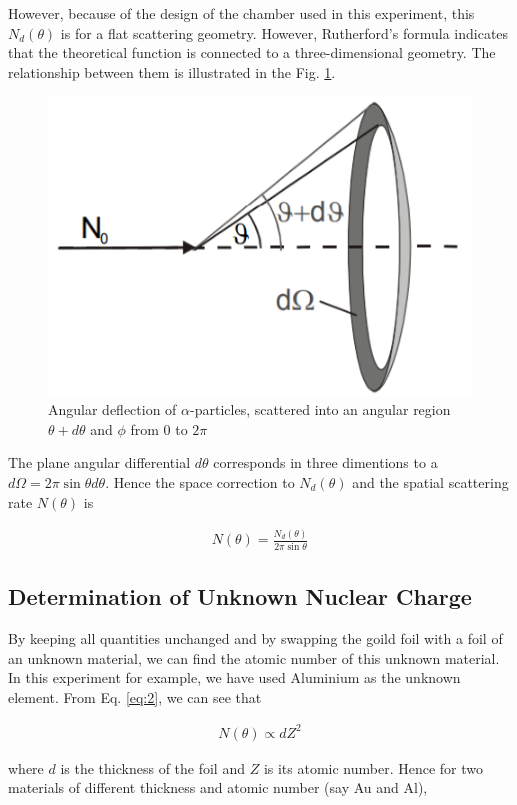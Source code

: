 However, because of the design of the chamber
used in this experiment, this $N_d(\theta)$ is for a flat scattering geometry. However, Rutherford’s formula indicates that the theoretical function is connected to a three-dimensional geometry. The relationship between them is
illustrated in the Fig. \ref{2}.

\begin{figure}
    \centering
    \includegraphics[width=0.6\columnwidth]{images/angle.png}
    \caption{Angular deflection of $\alpha$-particles, scattered into an angular region $\theta + d\theta$ and $\phi$ from 0 to $2\pi$}
    \label{2}
\end{figure}

The plane angular differential $d\theta$ corresponds
in three dimentions to a $d \Omega = 2\pi\sin\theta d\theta$.
Hence the space correction to $N_d(\theta)$ and the spatial
scattering rate $N(\theta)$ is

\begin{align} \label{eq:4}
    N(\theta) = \frac{N_d(\theta)}{2\pi\sin\theta}
\end{align}

\subsection{Determination of Unknown Nuclear Charge}

By keeping all quantities unchanged and by swapping the goild foil with a foil of an unknown material, we can find the atomic number of this unknown material. In this experiment for example, we have used Aluminium as the unknown element. From Eq. \ref{eq:2}, we can see that 

\begin{align*}
    N(\theta) \propto dZ^2
\end{align*}

where $d$ is the thickness of the foil and $Z$ is its atomic number. Hence for two materials of different thickness and atomic number (say Au and Al),

